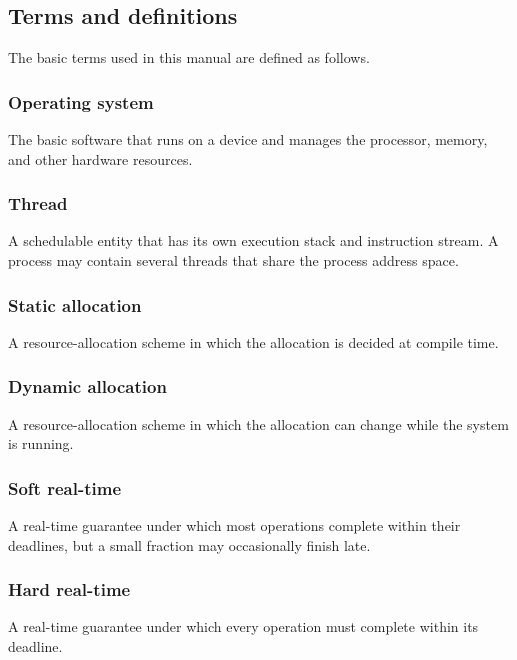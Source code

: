 \subsection{Terms and definitions}

The basic terms used in this manual are defined as follows.

\subsubsection{Operating system}

The basic software that runs on a device and manages the processor, memory, and other hardware resources.

\subsubsection{Thread}

A schedulable entity that has its own execution stack and instruction stream.
A process may contain several threads that share the process address space.

\subsubsection{Static allocation}

A resource-allocation scheme in which the allocation is decided at compile time.

\subsubsection{Dynamic allocation}

A resource-allocation scheme in which the allocation can change while the system is running.

\subsubsection{Soft real-time}

A real-time guarantee under which most operations complete within their deadlines, but a small fraction may occasionally finish late.

\subsubsection{Hard real-time}

A real-time guarantee under which every operation must complete within its deadline.

